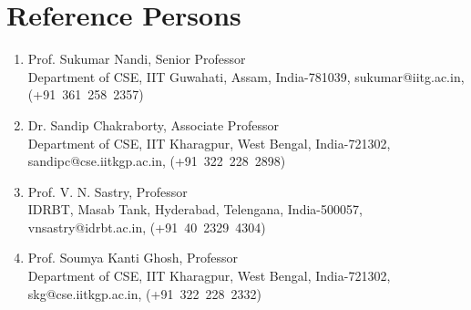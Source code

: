 \documentclass{article}
\begin{document}
\section{Reference Persons}
  \begin{enumerate}
  \item Prof. Sukumar Nandi, Senior Professor\\Department of CSE, IIT Guwahati, Assam, India-781039, sukumar@iitg.ac.in, (+91~361~258~2357)
  \item Dr. Sandip Chakraborty, Associate Professor\\Department of CSE, IIT Kharagpur, West Bengal, India-721302, sandipc@cse.iitkgp.ac.in, (+91~322~228~2898)
  \item Prof. V. N. Sastry, Professor\\IDRBT, Masab Tank, Hyderabad, Telengana, India-500057, vnsastry@idrbt.ac.in, (+91~40~2329~4304)
  \item Prof. Soumya Kanti Ghosh, Professor\\Department of CSE, IIT Kharagpur, West Bengal, India-721302, skg@cse.iitkgp.ac.in, (+91~322~228~2332)
  \end{enumerate}
  
  
\end{document}
